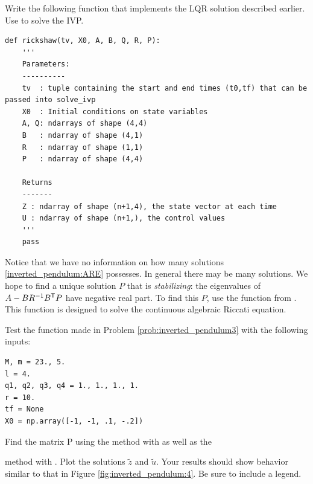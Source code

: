 \begin{problem}
	Write the following function that implements the LQR solution described earlier.  
	Use  to solve the IVP.
\begin{lstlisting}
def rickshaw(tv, X0, A, B, Q, R, P):
	'''
	Parameters:
	----------
	tv 	: tuple containing the start and end times (t0,tf) that can be passed into solve_ivp
	X0 	: Initial conditions on state variables
	A, Q: ndarrays of shape (4,4)
	B	: ndarray of shape (4,1)
	R	: ndarray of shape (1,1)
	P	: ndarray of shape (4,4)
	
	Returns
	-------
	Z : ndarray of shape (n+1,4), the state vector at each time
	U : ndarray of shape (n+1,), the control values
	'''
	pass
\end{lstlisting}
\label{prob:inverted_pendulum3}
\end{problem}


Notice that we have no information on how many solutions \eqref{inverted_pendulum:ARE} possesses. 
In general there may be many solutions. 
We hope to find a unique solution $P$ that is \textit{stabilizing}: the eigenvalues of $A - BR^{-1}B^{\mathsf T} P$ have negative real part. 
To find this $P$, use the function  from . 
This function is designed to solve the continuous algebraic Riccati equation. 


\begin{problem}
Test the function made in Problem \eqref{prob:inverted_pendulum3} with the following inputs: 
\begin{lstlisting}
M, m = 23., 5.
l = 4.
q1, q2, q3, q4 = 1., 1., 1., 1.
r = 10.
tf = None
X0 = np.array([-1, -1, .1, -.2])
\end{lstlisting}
Find the matrix P using the  method with  as well as the

\noindent {} method with .
Plot the solutions $\tilde{z}$ and $\tilde{u}$. 
Your results should show behavior similar to that in Figure \ref{fig:inverted_pendulum:4}.
Be sure to include a legend.
\label{prob:inverted_pendulum:4}
\end{problem}

